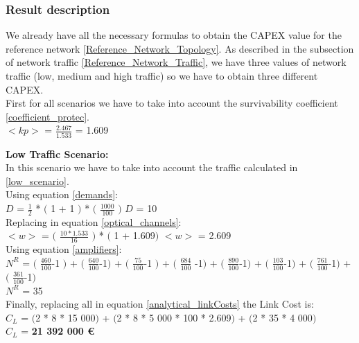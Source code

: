 \subsubsection{Result description}

We already have all the necessary formulas to obtain the CAPEX value for the reference network \ref{Reference_Network_Topology}. As described in the subsection of network traffic \ref{Reference_Network_Traffic}, we have three values of network traffic (low, medium and high traffic) so we have to obtain three different CAPEX.\\
First for all scenarios we have to take into account the survivability coefficient \ref{coefficient_protec}.\\

$<kp>$ = $\frac{2.467}{1.533}$ = 1.609

\textbf{Low Traffic Scenario:}\\
In this scenario we have to take into account the traffic calculated in \ref{low_scenario}.\\

Using equation \ref{demands}:\\

$D$ = $\frac{1}{2}$ * $($ 1 + 1 $)$ * $($ $\frac{1000}{100}$ $)$ \qquad \qquad $D$ = 10\\

Replacing in equation \ref{optical_channels}:\\

$<w>$ = $($ $\frac{10 * 1.533}{16}$ $)$ * $($ 1 + 1.609$)$ \qquad \qquad $<w>$ = 2.609\\

Using equation \ref{amplifiers}:\\

$N^R$ = $($ $\frac{460}{100}$-1 $)$ + $($ $\frac{640}{100}$-1$)$ + $($ $\frac{75}{100}$-1 $)$ + $($ $\frac{684}{100}$ -1$)$ + $($ $\frac{890}{100}$-1$)$ + $($ $\frac{103}{100}$-1$)$ + $($ $\frac{761}{100}$-1$)$ + $($ $\frac{361}{100}$-1$)$\\

$N^R$ = 35\\

Finally, replacing all in equation \ref{analytical_linkCosts} the Link Cost is:\\

$C_L$ = $($2 * 8 * 15 000$)$ + $($2 * 8 * 5 000 * 100 * 2.609$)$ + $($2 * 35 * 4 000$)$\\

$C_L$ = \textbf{21 392 000 \euro}\\

